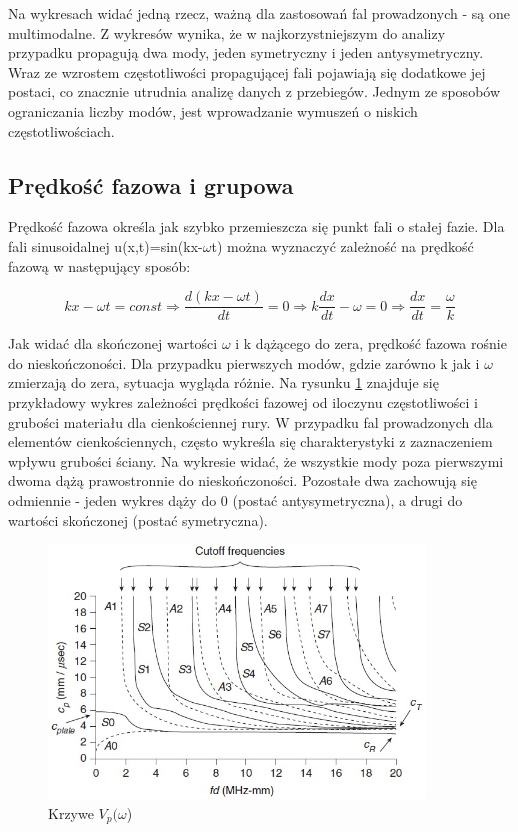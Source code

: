 Na wykresach widać jedną rzecz, ważną dla zastosowań fal prowadzonych - są one multimodalne. Z wykresów wynika, że w najkorzystniejszym do analizy przypadku propagują dwa mody, jeden symetryczny i jeden antysymetryczny. Wraz ze wzrostem częstotliwości propagującej fali pojawiają się dodatkowe jej postaci, co znacznie utrudnia analizę danych z przebiegów. Jednym ze sposobów ograniczania liczby modów, jest wprowadzanie wymuszeń o niskich częstotliwościach.

\subsection{Prędkość fazowa i grupowa}

Prędkość fazowa określa jak szybko przemieszcza się punkt fali o stałej fazie. Dla fali sinusoidalnej u(x,t)=sin(kx-\(\omega\)t) można wyznaczyć zależność na prędkość fazową w następujący sposób:

\begin{equation}
kx-\omega t=const \Rightarrow \frac{d(kx-\omega t)}{dt}=0 \Rightarrow k\frac{dx}{dt}-\omega=0
 \Rightarrow \frac{dx}{dt}=\frac{\omega}{k}
\end{equation}

Jak widać dla skończonej wartości \(\omega\) i k dążącego do zera, prędkość fazowa rośnie do nieskończoności. Dla przypadku pierwszych modów, gdzie zarówno k jak i \(\omega\) zmierzają do zera, sytuacja wygląda różnie. Na rysunku \ref{fig:krzywe_vp_od_omega} znajduje się przykładowy wykres zależności prędkości fazowej od iloczynu częstotliwości i grubości materiału dla cienkościennej rury. W przypadku fal prowadzonych dla elementów cienkościennych, często wykreśla się charakterystyki z zaznaczeniem wpływu grubości ściany. Na wykresie widać, że wszystkie mody poza pierwszymi dwoma dążą prawostronnie do nieskończoności. Pozostałe dwa zachowują się odmiennie - jeden wykres dąży do 0 (postać antysymetryczna), a drugi do wartości skończonej (postać symetryczna).

\begin{figure}[h]
\centering
\includegraphics[width=10cm]{Zdjecia/2/char_predkosc_fazowa}
\caption{Krzywe \(V_p(\omega\)) \cite{bartek_rose}}
\label{fig:krzywe_vp_od_omega}
\end{figure}

